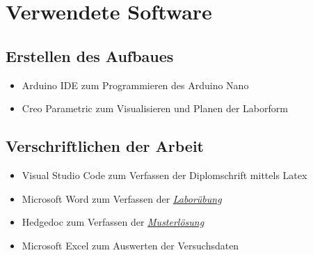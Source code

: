 \section{Verwendete Software}

\subsection{Erstellen des Aufbaues}

\begin{itemize}
    \item Arduino IDE zum Programmieren des Arduino Nano
    \item Creo Parametric zum Visualisieren und Planen der Laborform
\end{itemize}

\subsection{Verschriftlichen der Arbeit}

\begin{itemize}
    \item Visual Studio Code zum Verfassen der Diplomschrift mittels Latex
    \item Microsoft Word zum Verfassen der \hyperref[labuebung]{\textit{Laborübung}}
    \item Hedgedoc zum Verfassen der \hyperref[muster]{\textit{Musterlösung}}
    \item Microsoft Excel zum Auswerten der Versuchsdaten
\end{itemize}